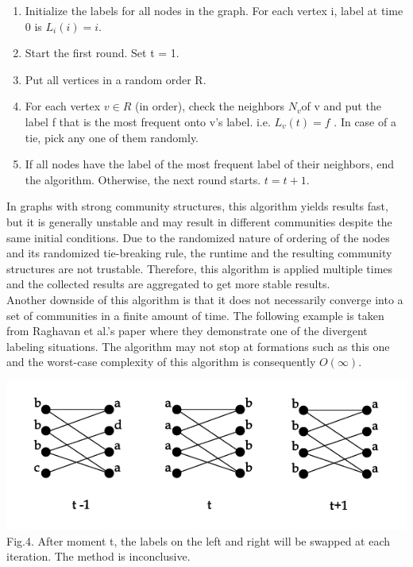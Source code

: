 \documentclass[10pt]{article}
\begin{document}
\begin{enumerate}
\item Initialize the labels for all nodes in the graph. For each vertex i, label at time 0 is $ L_i\left(i\right) = i$.
\item Start the first round. Set t = 1. 
\item Put all vertices in a random order R.
\item For each vertex $v \in R$ (in order), check the neighbors $N_{v}$of v and put the label f that is the most frequent onto v’s label. i.e. $ L_v\left(t\right) = f$ . In case of a tie, pick any one of them randomly.
\item If all nodes have the label of the most frequent label of their neighbors, end the algorithm. Otherwise, the next round starts. $t = t+1$.
\end{enumerate}

In graphs with strong community structures, this algorithm yields results fast\cite{raghavan}, but it is generally unstable and may result in different communities despite the same initial conditions. Due
to the randomized nature of ordering of the nodes and its randomized tie-breaking rule, the runtime and the resulting community structures are not trustable. Therefore, this algorithm is applied multiple times and the collected results are aggregated to get more stable results. \\

Another downside of this algorithm is that it does not necessarily converge into a set of communities in a finite amount of time. The following example is taken from Raghavan et al.’s paper where they demonstrate one of the divergent labeling situations. The algorithm may not stop at formations such as this one and the worst-case complexity of this algorithm is consequently $O(\infty )$. \\

\begin{center}
    \includegraphics[scale=0.7]{labelPropLoop.png} \\
    Fig.4. After moment t, the labels on the left and right will be swapped at each iteration. The method is inconclusive. \cite{raghavan}
\end{center}
\end{document}
